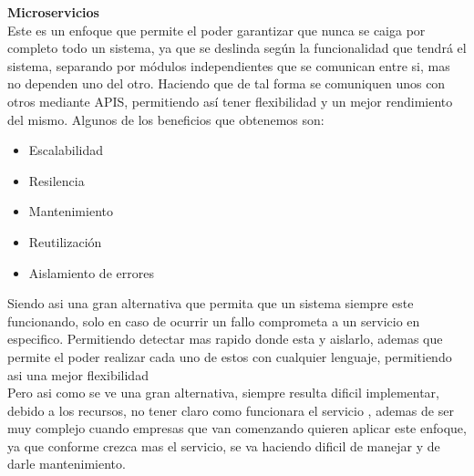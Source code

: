 \documentclass[12pt]{article}
\begin{document}
\textbf{Microservicios } \\
Este es un enfoque que permite el poder garantizar que nunca se caiga por completo todo un sistema, ya que se deslinda según la funcionalidad que tendrá el sistema, separando por módulos independientes que se comunican entre si, mas no dependen uno del otro. Haciendo que de tal forma se comuniquen unos con otros mediante APIS, permitiendo así tener flexibilidad y un mejor rendimiento del mismo.
Algunos de los beneficios que obtenemos son:
\begin{itemize}
    \item Escalabilidad
    \item Resilencia
    \item Mantenimiento
    \item Reutilización
    \item Aislamiento de errores
\end{itemize}
Siendo asi  una gran alternativa que permita que un sistema siempre este funcionando, solo en caso de ocurrir un fallo  comprometa a un servicio en especifico. Permitiendo detectar mas rapido donde esta y aislarlo,  ademas que permite el poder realizar cada uno de estos con cualquier lenguaje, permitiendo asi una mejor flexibilidad
 \\ 
Pero asi como se ve una gran alternativa, siempre resulta dificil implementar, debido a los recursos, no tener claro como funcionara el servicio , ademas de ser muy complejo cuando empresas que van comenzando quieren aplicar este enfoque, ya que conforme crezca mas el servicio, se va haciendo dificil de manejar y de darle mantenimiento.
 \\
\end{document}
